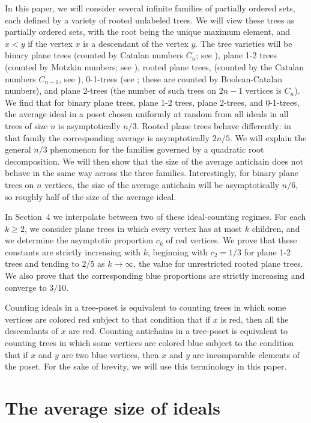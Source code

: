 \documentclass[10pt,a4paper]{amsart}
\theoremstyle{remark}
\begin{document}
In this paper, we will consider several infinite families of partially ordered sets, each defined by a variety of rooted unlabeled trees. 
We will view these trees as partially ordered sets, with the root being the unique maximum element, and $x<y$ if the vertex $x$ is a descendant of the 
vertex $y$. The  tree varieties will
be binary plane trees (counted by Catalan numbers $C_n$; see \cite{StanleyCatalan}), plane 1-2 trees (counted by Motzkin numbers; see \cite{DonagheyShapiro}), rooted plane trees, (counted by the Catalan numbers $C_{n-1}$, see \cite{StanleyCatalan}), 0-1-trees (see \cite{Bona01Trees}; these are counted by Boolean-Catalan numbers), and plane 2-trees (the number of such trees on $2n-1$ vertices is $C_n$). 
We find that for binary plane trees, plane 1-2 trees, plane 2-trees, and 0-1-trees, the average ideal in a poset chosen uniformly at random from all ideals in all trees of size $n$ is asymptotically $n/3$. Rooted plane trees behave differently: in that family the corresponding average is asymptotically $2n/5$. We will explain the general $n/3$ phenomenon for the families governed by a quadratic root decomposition. We will then show that the size of the average antichain does not behave in the same
way across the three families. Interestingly, for binary plane trees on $n$ vertices, the size of the average antichain will be asymptotically $n/6$, so roughly half of the size of the average ideal. 

In Section~4 we interpolate between two of these ideal-counting regimes.  For each $k\geq 2$, we consider plane trees in which every vertex has at most $k$ children, and we determine the asymptotic proportion $c_k$ of red vertices.  We prove that these constants are strictly increasing with $k$, beginning with $c_2=1/3$ for plane 1-2 trees and tending to $2/5$ as $k\to\infty$, the value for unrestricted rooted plane trees. We also prove that the corresponding blue proportions are strictly increasing and converge to $3/10$.

Counting ideals in a tree-poset is equivalent to counting trees in which some vertices are colored red subject to that condition that if $x$ is red, then all the descendants of $x$ are red. Counting antichains in a tree-poset is equivalent to counting trees in which some vertices are colored blue subject to the condition that if $x$ and $y$ are two blue vertices, then $x$ and $y$ are incomparable elements of the poset.  For the sake of brevity, we will use this terminology in this paper. 

\section{The average size of ideals}
\label{sec:ideals}
\end{document}
